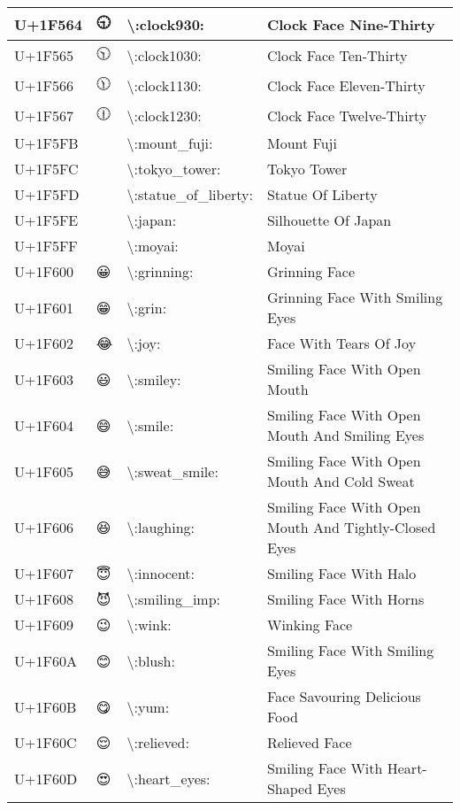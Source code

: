 \begin{table}[h]
\begin{tabulary}{\linewidth}{|L|L|L|L|}
\hline
U+1F564 & 🕤 & {\textbackslash}:clock930: & Clock Face Nine-Thirty \\
\hline
U+1F565 & 🕥 & {\textbackslash}:clock1030: & Clock Face Ten-Thirty \\
\hline
U+1F566 & 🕦 & {\textbackslash}:clock1130: & Clock Face Eleven-Thirty \\
\hline
U+1F567 & 🕧 & {\textbackslash}:clock1230: & Clock Face Twelve-Thirty \\
\hline
U+1F5FB & 🗻 & {\textbackslash}:mount\_fuji: & Mount Fuji \\
\hline
U+1F5FC & 🗼 & {\textbackslash}:tokyo\_tower: & Tokyo Tower \\
\hline
U+1F5FD & 🗽 & {\textbackslash}:statue\_of\_liberty: & Statue Of Liberty \\
\hline
U+1F5FE & 🗾 & {\textbackslash}:japan: & Silhouette Of Japan \\
\hline
U+1F5FF & 🗿 & {\textbackslash}:moyai: & Moyai \\
\hline
U+1F600 & 😀 & {\textbackslash}:grinning: & Grinning Face \\
\hline
U+1F601 & 😁 & {\textbackslash}:grin: & Grinning Face With Smiling Eyes \\
\hline
U+1F602 & 😂 & {\textbackslash}:joy: & Face With Tears Of Joy \\
\hline
U+1F603 & 😃 & {\textbackslash}:smiley: & Smiling Face With Open Mouth \\
\hline
U+1F604 & 😄 & {\textbackslash}:smile: & Smiling Face With Open Mouth And Smiling Eyes \\
\hline
U+1F605 & 😅 & {\textbackslash}:sweat\_smile: & Smiling Face With Open Mouth And Cold Sweat \\
\hline
U+1F606 & 😆 & {\textbackslash}:laughing: & Smiling Face With Open Mouth And Tightly-Closed Eyes \\
\hline
U+1F607 & 😇 & {\textbackslash}:innocent: & Smiling Face With Halo \\
\hline
U+1F608 & 😈 & {\textbackslash}:smiling\_imp: & Smiling Face With Horns \\
\hline
U+1F609 & 😉 & {\textbackslash}:wink: & Winking Face \\
\hline
U+1F60A & 😊 & {\textbackslash}:blush: & Smiling Face With Smiling Eyes \\
\hline
U+1F60B & 😋 & {\textbackslash}:yum: & Face Savouring Delicious Food \\
\hline
U+1F60C & 😌 & {\textbackslash}:relieved: & Relieved Face \\
\hline
U+1F60D & 😍 & {\textbackslash}:heart\_eyes: & Smiling Face With Heart-Shaped Eyes \\

\end{tabulary}
\end{table}
